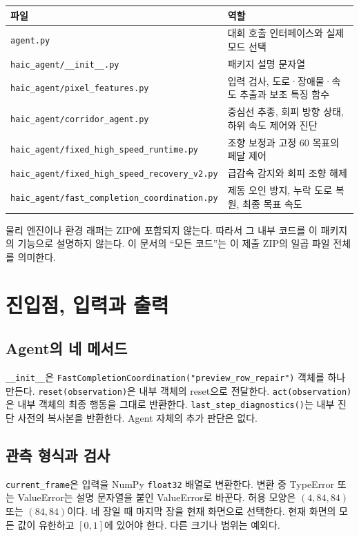 \documentclass[11pt,a4paper]{article}
\newcommand{\code}[1]{{\small\nolinkurl{#1}}}
\begin{document}
\par\noindent\begin{tabularx}{\linewidth}{@{}p{74mm}X@{}}\toprule
파일 & 역할 \\\midrule
\code{agent.py} & 대회 호출 인터페이스와 실제 모드 선택 \\
\code{haic_agent/__init__.py} & 패키지 설명 문자열 \\
\code{haic_agent/pixel_features.py} & 입력 검사, 도로·장애물·속도 추출과 보조 특징 함수 \\
\code{haic_agent/corridor_agent.py} & 중심선 추종, 회피 방향 상태, 하위 속도 제어와 진단 \\
\code{haic_agent/fixed_high_speed_runtime.py} & 조향 보정과 고정 60 목표의 페달 제어 \\
\code{haic_agent/fixed_high_speed_recovery_v2.py} & 급감속 감지와 회피 조향 해제 \\
\code{haic_agent/fast_completion_coordination.py} & 제동 오인 방지, 누락 도로 복원, 최종 목표 속도 \\\bottomrule
\end{tabularx}

물리 엔진이나 환경 래퍼는 ZIP에 포함되지 않는다. 따라서 그 내부 코드를 이 패키지의 기능으로 설명하지 않는다. 이 문서의 ``모든 코드''는 이 제출 ZIP의 일곱 파일 전체를 의미한다.

\section{진입점, 입력과 출력}
\subsection{Agent의 네 메서드}
\code{__init__}은 \code{FastCompletionCoordination("preview_row_repair")} 객체를 하나 만든다. \code{reset(observation)}은 내부 객체의 reset으로 전달한다. \code{act(observation)}은 내부 객체의 최종 행동을 그대로 반환한다. \code{last_step_diagnostics()}는 내부 진단 사전의 복사본을 반환한다. Agent 자체의 추가 판단은 없다.

\subsection{관측 형식과 검사}
\code{current_frame}은 입력을 NumPy \code{float32} 배열로 변환한다. 변환 중 TypeError 또는 ValueError는 설명 문자열을 붙인 ValueError로 바꾼다. 허용 모양은 $(4,84,84)$ 또는 $(84,84)$이다. 네 장일 때 마지막 장을 현재 화면으로 선택한다. 현재 화면의 모든 값이 유한하고 $[0,1]$에 있어야 한다. 다른 크기나 범위는 예외다.
\end{document}

